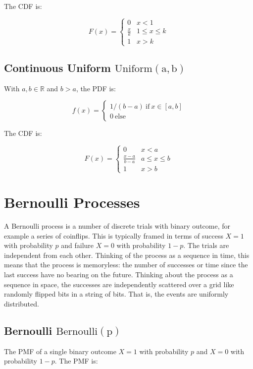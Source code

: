 The CDF is:

\begin{equation}
F(x)= \left\{\begin{array}{cl} 
0& x < 1\\
\frac{x}{k}& 1\leq x \leq k\\
1& x>k
\end{array} \right.
\end{equation}

\subsection{Continuous Uniform $\mathrm{Uniform(a,b)}$}

With $a,b\in\mathbb{R}$ and $b>a$, the PDF is:

\begin{equation}
f(x) = \left\{\begin{array}{l} 1/(b-a) \mathrm{\ if\ }x \in [a,b] \\ 0\mathrm{\ else}\end{array} \right.
\end{equation}

The CDF is:

\begin{equation}
F(x)= \left\{\begin{array}{cl} 
0& x < a\\
\frac{x-a}{b-a}& a\leq x \leq b\\
1& x>b
\end{array} \right.
\end{equation}


\section{Bernoulli Processes}
A Bernoulli process is a number of discrete trials with binary outcome, for example a series of coinflips. This is typically framed in terms of success $X=1$ with probability $p$ and failure $X=0$ with probability $1-p$. The trials are independent from each other. Thinking of the process as a sequence in time, this means that the process is memoryless: the number of successes or time since the last success have no bearing on the future. Thinking about the process as a sequence in space, the successes are independently scattered over a grid like randomly flipped bits in a string of bits. That is, the events are uniformly distributed.


\subsection{Bernoulli $\mathrm{Bernoulli(p)}$}
The PMF of a single binary outcome $X=1$ with probability $p$ and $X=0$ with probability $1-p$. The PMF is:

